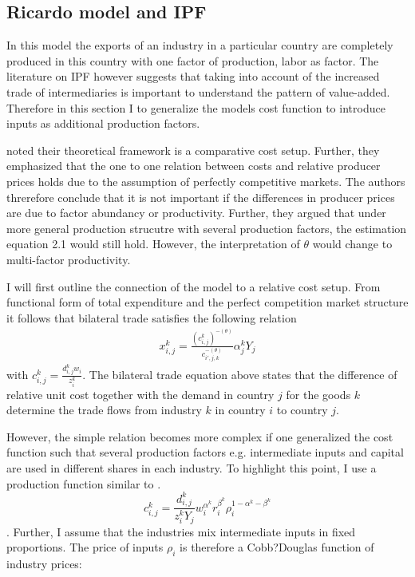 \subsection{Ricardo model and IPF}
In this model the exports of an industry in a particular country are completely produced in this country with one factor of production, labor as factor. The literature on IPF however suggests that taking into account of the increased trade of intermediaries is important to understand the pattern of value-added. Therefore in this section I   to generalize the models cost function to introduce inputs as additional production factors. \par 
\textcite{costinot} noted their theoretical framework is a comparative cost setup. Further, they emphasized that the one to one relation between costs and relative producer prices holds due to the assumption of perfectly competitive markets. The authors threrefore conclude that it is not important if the differences in producer prices are due to factor abundancy or productivity. Further, they argued that under more general production strucutre with several production factors, the estimation equation 2.1 would still hold. However, the interpretation of $\theta$ would change to multi-factor productivity. \par  I will first outline the connection of the model to a relative cost setup. 
From  functional form of total expenditure and the perfect competition market structure it follows that bilateral trade satisfies the following relation \begin{align}
 x^k_{i,j}= \frac{(c^k_{i,j})^{ -(\theta) } } { c_{i',j,k}^{-(\theta) } }  \alpha^k_j Y_j 
\end{align} with $c^k_{i,j}=\frac{d^k_{i,j} w_i}{z_i^k}$.
 The bilateral trade equation above states that the difference of relative unit cost together with the demand in country $j$ for the goods $k$ determine the trade flows from industry $k$ in country $i$ to country $j$. 
 \par 
 However, the simple relation becomes more complex if one generalized the cost function such that several production factors e.g. intermediate inputs and capital are used in different shares in each industry. To highlight this point, I use a production function similar to \textcite{Shikher}.  \[ c^k_{i,j}=\frac{d^k_{i,j}}{z_{i}^k Y_j} w^{\alpha^k}_i r^{\beta^k}_i \rho^{1-\alpha^k-\beta^k}_{i} \]. Further, I assume that the industries mix intermediate inputs in fixed proportions. The price of inputs $\rho_i$ is therefore a Cobb?Douglas function of industry prices:
